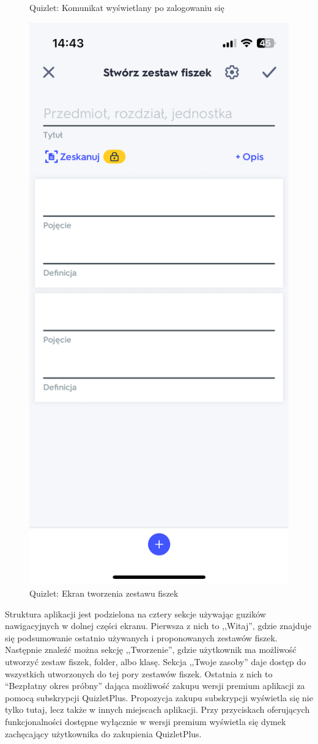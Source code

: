 \documentclass[final,a4paper,openany,12pt]{mwbk}
\begin{document}
\begin{figure}[H]
\begin{minipage}{0.5\textwidth}
  \caption{Quizlet: Komunikat wyświetlany po zalogowaniu się}
  \label{fig:quizlet3}
\end{minipage}%
\begin{minipage}{0.5\textwidth}
  \centering
  \includegraphics[width=.75\linewidth]{img/quizlet4.PNG}
  \caption{Quizlet: Ekran tworzenia zestawu fiszek}
  \label{fig:quizlet4}
\end{minipage}
\end{figure}

Struktura aplikacji jest podzielona na cztery sekcje używając guzików nawigacyjnych w dolnej części ekranu. Pierwsza z nich to ,,Witaj'', gdzie znajduje się podsumowanie ostatnio używanych i proponowanych zestawów fiszek. Następnie znaleźć można sekcję ,,Tworzenie'', gdzie użytkownik ma możliwość utworzyć zestaw fiszek, folder, albo klasę. Sekcja ,,Twoje zasoby'' daje dostęp do wszystkich utworzonych do tej pory zestawów fiszek. Ostatnia z nich to “Bezpłatny okres próbny” dająca możliwość zakupu wersji premium aplikacji za pomocą subskrypcji QuizletPlus. Propozycja zakupu subskrypcji wyświetla się nie tylko tutaj, lecz także w innych miejscach aplikacji. Przy przyciskach oferujących funkcjonalności dostępne wyłącznie w wersji premium wyświetla się dymek zachęcający użytkownika do zakupienia QuizletPlus. 
\end{document}
